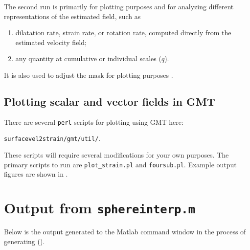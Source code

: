 \documentclass[11pt,titlepage,fleqn]{article}
\begin{document}
The second run is primarily for plotting purposes and for analyzing different representations of the estimated field, such as 
%
\begin{enumerate}
\item dilatation rate, strain rate, or rotation rate, computed directly from the estimated velocity field;
\item any quantity at cumulative or individual scales ($q$).
\end{enumerate}
%
It is also used to adjust the mask for plotting purposes \citep{Tape2009gps}.


\subsection*{Plotting scalar and vector fields in GMT}

There are several \verb+perl+ scripts for plotting using GMT \citep{GMT} here:

\verb+surfacevel2strain/gmt/util/+.

\noindent
These scripts will require several modifications for your own purposes.
The primary scripts to run are \verb+plot_strain.pl+ and \verb+foursub.pl+.
Example output figures are shown in .

{}




\appendix
\section{Output from {\tt sphereinterp.m}}
\label{sec:sphereinterp_out}

Below is the output generated to the Matlab command window in the process of generating  ().
\end{document}
